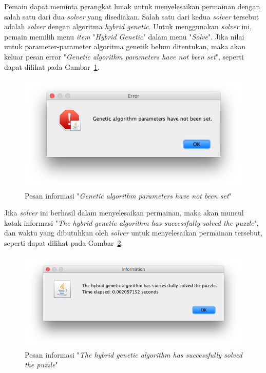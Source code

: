 \begin{enumerate}
Pemain dapat meminta perangkat lunak untuk menyelesaikan permainan dengan salah satu dari dua \textit{solver} yang disediakan. Salah satu dari kedua \textit{solver} tersebut adalah \textit{solver} dengan algoritma \textit{hybrid genetic}. Untuk menggunakan \textit{solver} ini, pemain memilih menu \textit{item} "\textit{Hybrid Genetic}" dalam menu "\textit{Solve}". Jika nilai untuk parameter-parameter algoritma genetik belum ditentukan, maka akan keluar pesan error "\textit{Genetic algorithm parameters have not been set}", seperti dapat dilihat pada Gambar~\ref{fig:gaparametershavenotbeenset}.

\begin{figure}
\centering
\captionsetup{justification=centering}
\includegraphics[scale=0.5]{Gambar/ImplementasiPengujian/GAParametersHaveNotBeenSet.png}
\caption[Pesan informasi "\textit{Genetic algorithm parameters have not been set}"]{Pesan informasi "\textit{Genetic algorithm parameters have not been set}"}
\label{fig:gaparametershavenotbeenset}
\end{figure}

Jika \textit{solver} ini berhasil dalam menyelesaikan permainan, maka akan muncul kotak informasi "\textit{The hybrid genetic algorithm has successfully solved the puzzle}", dan waktu yang dibutuhkan oleh \textit{solver} untuk menyelesaikan permainan tersebut, seperti dapat dilihat pada Gambar~\ref{fig:hybridgeneticsuccess}.

\begin{figure}
\centering
\captionsetup{justification=centering}
\includegraphics[scale=0.5]{Gambar/ImplementasiPengujian/HybridGeneticSuccess.png}
\caption[Pesan informasi "\textit{The hybrid genetic algorithm has successfully solved the puzzle}"]{Pesan informasi "\textit{The hybrid genetic algorithm has successfully solved the puzzle}"}
\label{fig:hybridgeneticsuccess}
\end{figure}


\end{enumerate}
